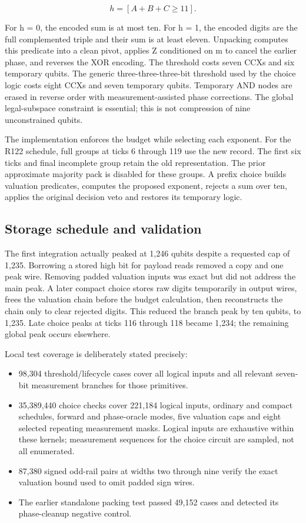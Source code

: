 \documentclass[11pt,letterpaper]{article}
\begin{document}
\[
h=[A+B+C\geq11].
\]

For h = 0, the encoded sum is at most ten. For h = 1, the encoded digits are the full complemented triple and their sum is at least eleven. Unpacking computes this predicate into a clean pivot, applies Z conditioned on m to cancel the earlier phase, and reverses the XOR encoding. The threshold costs seven CCXs and six temporary qubits. The generic three-three-three-bit threshold used by the choice logic costs eight CCXs and seven temporary qubits. Temporary AND nodes are erased in reverse order with measurement-assisted phase corrections. The global legal-subspace constraint is essential; this is not compression of nine unconstrained qubits.


The implementation enforces the budget while selecting each exponent. For the R122 schedule, full groups at ticks 6 through 119 use the new record. The first six ticks and final incomplete group retain the old representation. The prior approximate majority pack is disabled for these groups. A prefix choice builds valuation predicates, computes the proposed exponent, rejects a sum over ten, applies the original decision veto and restores its temporary logic.


\subsection{Storage schedule and validation}

The first integration actually peaked at 1,246 qubits despite a requested cap of 1,235. Borrowing a stored high bit for payload reads removed a copy and one peak wire. Removing padded valuation inputs was exact but did not address the main peak. A later compact choice stores raw digits temporarily in output wires, frees the valuation chain before the budget calculation, then reconstructs the chain only to clear rejected digits. This reduced the branch peak by ten qubits, to 1,235. Late choice peaks at ticks 116 through 118 became 1,234; the remaining global peak occurs elsewhere.


Local test coverage is deliberately stated precisely:


\begin{itemize}
\item 98,304 threshold/lifecycle cases cover all logical inputs and all relevant seven-bit measurement branches for those primitives.
\item 35,389,440 choice checks cover 221,184 logical inputs, ordinary and compact schedules, forward and phase-oracle modes, five valuation caps and eight selected repeating measurement masks. Logical inputs are exhaustive within these kernels; measurement sequences for the choice circuit are sampled, not all enumerated.
\item 87,380 signed odd-rail pairs at widths two through nine verify the exact valuation bound used to omit padded sign wires.
\item The earlier standalone packing test passed 49,152 cases and detected its phase-cleanup negative control.
\end{itemize}
\end{document}
